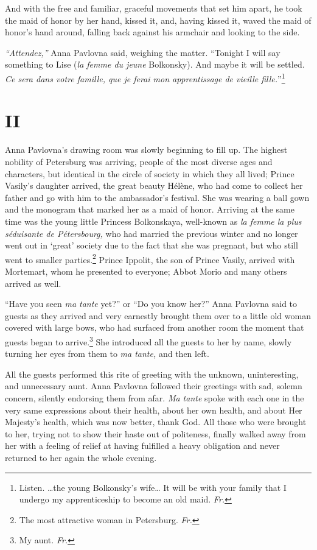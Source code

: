 And with the free and familiar, graceful movements that set him apart, he took the maid of honor by her hand, kissed it, and, having kissed it, waved the maid of honor's hand around, falling back against his armchair and looking to the side.

\textit{``Attendez,''} Anna Pavlovna said, weighing the
matter. ``Tonight I will say something to Lise (\textit{la femme du jeune} Bolkonsky). And maybe it will be settled. \textit{Ce sera dans votre famille, que je ferai mon apprentissage de vieille fille.}''\footnote{Listen. \ldots{}the young Bolkonsky's wife\ldots{} It will be with your family that I undergo my apprenticeship to become an old maid. \textit{Fr.}}

\section*{II} %

Anna Pavlovna's drawing room was slowly beginning to fill up. The highest nobility of Petersburg was arriving, people of the most diverse ages and characters, but identical in the circle of society in which they all lived; Prince Vasily's daughter arrived, the great beauty H\'el\`ene, who had come to collect her father and go with him to the ambassador's festival. She was wearing a ball gown and the monogram that marked her as a maid of honor. Arriving at the same time was the young little Princess Bolkonskaya, well-known as \textit{la femme la plus s\'eduisante de P\'etersbourg,} who had married the previous winter and no longer went out in `great' society due to the fact that she was pregnant, but who still went to smaller parties.\footnote{The most attractive woman in Petersburg. \textit{Fr.}} Prince Ippolit, the son of Prince Vasily, arrived with Mortemart, whom he presented to everyone; Abbot Morio and many others arrived as well.

``Have you seen \textit{ma tante} yet?'' or ``Do you know her?'' Anna Pavlovna said to guests as they arrived and very earnestly brought them over to a little old woman covered with large bows, who had surfaced from another room the moment that guests began to arrive.\footnote{My aunt. \textit{Fr.}} She introduced all the guests to her by name, slowly turning her eyes from them to \textit{ma tante,} and then left. %

All the guests performed this rite of greeting with the unknown, uninteresting, and unnecessary aunt. Anna Pavlovna followed their greetings with sad, solemn concern, silently endorsing them from afar. \textit{Ma tante} spoke with each one in the very same expressions about their health, about her own health, and about Her Majesty's health, which was now better, thank God. All those who were brought to her, trying not to show their haste out of politeness, finally walked away from her with a feeling of relief at having fulfilled a heavy obligation and never returned to her again the whole evening.

